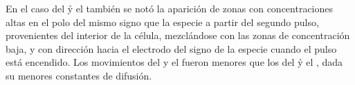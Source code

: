 En el caso del \h y el \oh también se notó la aparición de zonas con concentraciones altas en el polo del mismo signo que la especie a partir del segundo pulso, provenientes del interior de la célula, mezclándose con las zonas de concentración baja, y con dirección hacia el electrodo del signo de la especie cuando el pulso está encendido. Los movimientos del \na y el \cl fueron menores que los del \h y el \oh, dada su menores constantes de difusión.

\begin{comment}
TODO ESTO ESTA MAL!!: (resultados viejos)

Se lograron con cuatro pulsos cambios en las concentraciones interiores y exteriores de todas las especies mucho mayores a los obtenidos con un pulso. 

cambiar donde dice "a continuación se presentan en la intro" xq en las imágenes no se alcanza a observar bien

los valores cambian segun los pulsos estén encendidos o apagados (no se alcanza a observar en las imágenes)

En el interior de la célula se obtienen valores altos de concentración muy cerca de la membrana del polo del mismo signo que la especie. esto no depende del momento del pulso (es constante)

en cambio en el polo opuesto (del lado interno también) se observa un comportamiento muy variado según si el pulso está apagado o prendido. en el primer pulso se obtienen valores bajos, es decir un comportamiento opuesto al del polo del mismo signo. Al apagarse el primer pulso se obtienen valores aún más bajos en el extremo de polo opuesto, y los valores de concentración que habían anteriormente (en el polo opuesto) avanzan hacia el ecuador. Sin embargo al encenderse el segundo pulso aparecen valores altos de concentración, que avanzan hacia el ecuador, en vez de obtenerse valores bajos como en el primer pulso. En el tiempo restante se repite el mismo proceso: valores altos en la zona interna cercana al polo opuesto mientras que el pulso está encendido, y bajos cuando el pulso está apagado, en todos los casos avanzando hacia el polo de mismo signo y con la zona cercana al polo del mismo signo con concentración alta constante.

En cuanto a la región extracelular se obtuvieron en la mitad cercana al polo del mismo signo muchos cambios de concentración: durante el tiempo que el pulso está apagado se obtienen frentes de concentración bajos que salen del polo del mismo signo que la especie y avanzan hacia el electrodo del mismo signo, mientras que en los momentos que el pulso está on sucede lo mismo 








quiero decir que las concentraciones externas en la mitad del mismo signo que la especie poseen cambios extremos provenientes de la célula 

cambios concentraciones exteriores en zonas polares según valencia
prendido y apagado 
zona roja

\end{comment}

